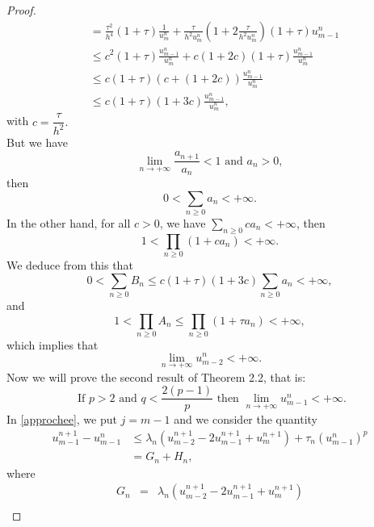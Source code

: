 \documentclass[a4paper,12pt,english,reqno]{smfart}
\begin{document}
\begin{proof}
\begin{align*}
		& = \frac{\tau^{2}}{h^{4}}(1+\tau)\frac{1}{u_{m}^{n}}+\frac{\tau}{h^{2}u_{m}^{n}}(1+2\frac{\tau}{h^{2}u_{m}^{n}})(1+\tau)u_{m-1}^{n}\\
		& \leq c^{2}(1+\tau)\frac{u_{m-1}^{n}}{u_{m}^{n}}+c(1+2c)(1+\tau)\frac{u_{m-1}^{n}}{u_{m}^{n}}\\
		&\leq c(1+\tau)\left(c+(1+2c)\right)\frac{u_{m-1}^{n}}{u_{m}^{n}}\\
		&\leq c(1+\tau)(1+3c)\frac{u_{m-1}^{n}}{u_{m}^{n}},
		\end{align*} 
		with $c=\dfrac{\tau}{h^{2}}.$\\
		But we have
		\begin{equation*}
		\lim_{n\rightarrow +\infty}\frac{a_{n+1}}{a_{n}}<1 \text{ and } a_{n}>0,
		\end{equation*}
		then
		\begin{equation*}
		0< \sum_{n\geq0}{a_{n}}< +\infty.
		\end{equation*}
		In the other hand, for all $c>0$, we have $\sum\limits_{n\geq0}{ca_{n}}< +\infty$, then
		\begin{equation*}
		1< \prod_{n\geq 0} (1+ca_{n})< +\infty. 
		\end{equation*}
		We deduce from this that
		\begin{equation*}
		0<\sum_{n\geq 0}{ B_{n}}\leq c(1+\tau)(1+3c)\sum_{n\geq0}{a_{n}}<+\infty,
		\end{equation*}
		and
		\begin{equation*}
		1<\prod_{n\geq0}{A_{n}}\leq \prod_{n\geq 0} (1+\tau a_{n})<+\infty,
		\end{equation*}
		which implies that 
		\begin{equation*}
		\lim_{n\rightarrow +\infty}u_{m-2}^{n}<+\infty.
		\end{equation*}
		Now we will prove the second result of Theorem 2.2, that is:
		\begin{equation*}
		\text{ If } p>2 \text{ and } q<\frac{2(p-1)}{p} \text{ then } \lim_{n\rightarrow +\infty} u_{m-1}^{n}< +\infty.
		\end{equation*}
		In \eqref{approchee}, we put $j=m-1$ and we consider the quantity
		\begin{align*}
		u_{m-1}^{n+1}-u_{m-1}^{n} & \leq \lambda_{n}(u_{m-2}^{n+1}-2u_{m-1}^{n+1}+u_{m}^{n+1})+\tau_{n}(u_{m-1}^{n})^{p}\\
		& =G_{n}+H_{n},
		\end{align*}
		where
		\begin{eqnarray*}
			G_{n}&=& \lambda_{n}(u_{m-2}^{n+1}-2u_{m-1}^{n+1}+u_{m}^{n+1})\\

\end{eqnarray*}
\end{proof}
\end{document}
